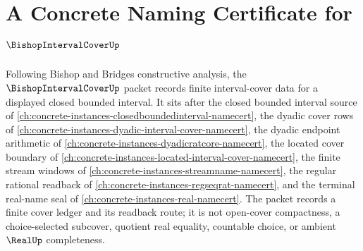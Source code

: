 \chapter{A Concrete Naming Certificate for $\BishopIntervalCoverUp$}
\label{ch:concrete-instances-bishop-interval-cover-namecert}

Following Bishop and Bridges constructive analysis, the $\BishopIntervalCoverUp$ packet records finite interval-cover data for a displayed closed bounded interval. It sits after the closed bounded interval source of \autoref{ch:concrete-instances-closedboundedinterval-namecert}, the dyadic cover rows of \autoref{ch:concrete-instances-dyadic-interval-cover-namecert}, the dyadic endpoint arithmetic of \autoref{ch:concrete-instances-dyadicratcore-namecert}, the located cover boundary of \autoref{ch:concrete-instances-located-interval-cover-namecert}, the finite stream windows of \autoref{ch:concrete-instances-streamname-namecert}, the regular rational readback of \autoref{ch:concrete-instances-regseqrat-namecert}, and the terminal real-name seal of \autoref{ch:concrete-instances-real-namecert}. The packet records a finite cover ledger and its readback route; it is not open-cover compactness, a choice-selected subcover, quotient real equality, countable choice, or ambient $\RealUp$ completeness.

